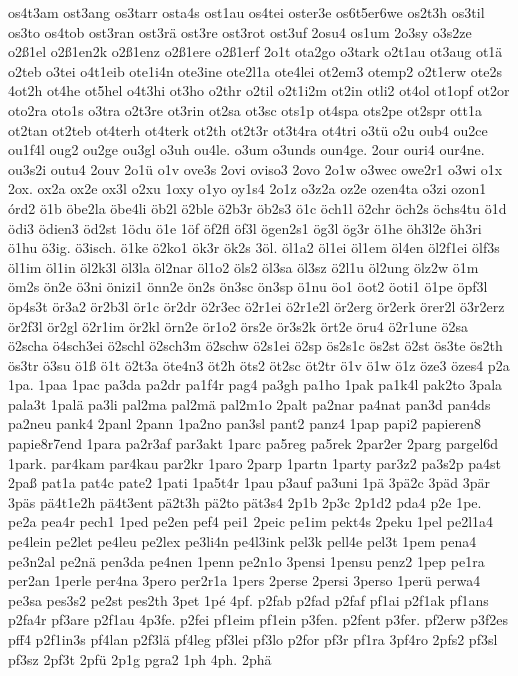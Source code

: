 {os4t3am
ost3ang
os3tarr
osta4s
ost1au
os4tei
oster3e
os6t5er6we
os2t3h
os3til
os3to
os4tob
ost3ran
ost3rä
ost3re
ost3rot
ost3uf
2osu4
os1um
2o3sy
o3s2ze
o2ß1el
o2ß1en2k
o2ß1enz
o2ß1ere
o2ß1erf
2o1t
ota2go
o3tark
o2t1au
ot3aug
ot1ä
o2teb
o3tei
o4t1eib
ote1i4n
ote3ine
ote2l1a
ote4lei
ot2em3
otemp2
o2t1erw
ote2s
4ot2h
ot4he
ot5hel
o4t3hi
ot3ho
o2thr
o2til
o2t1i2m
ot2in
otli2
ot4ol
ot1opf
ot2or
oto2ra
oto1s
o3tra
o2t3re
ot3rin
ot2sa
ot3sc
ots1p
ot4spa
ots2pe
ot2spr
ott1a
ot2tan
ot2teb
ot4terh
ot4terk
ot2th
ot2t3r
ot3t4ra
ot4tri
o3tü
o2u
oub4
ou2ce
ou1f4l
oug2
ou2ge
ou3gl
o3uh
ou4le.
o3um
o3unds
oun4ge.
2our
ouri4
our4ne.
ou3s2i
outu4
2ouv
2o1ü
o1v
ove3s
2ovi
oviso3
2ovo
2o1w
o3wec
owe2r1
o3wi
o1x
2ox.
ox2a
ox2e
ox3l
o2xu
1oxy
o1yo
oy1s4
2o1z
o3z2a
oz2e
ozen4ta
o3zi
ozon1
órd2
ö1b
öbe2la
öbe4li
öb2l
ö2ble
ö2b3r
öb2s3
ö1c
öch1l
ö2chr
öch2s
öchs4tu
ö1d
ödi3
ödien3
öd2st
1ödu
ö1e
1öf
öf2fl
öf3l
ögen2s1
ög3l
ög3r
ö1he
öh3l2e
öh3ri
ö1hu
ö3ig.
ö3isch.
ö1ke
ö2ko1
ök3r
ök2s
3öl.
öl1a2
öl1ei
öl1em
öl4en
öl2f1ei
ölf3s
öl1im
öl1in
öl2k3l
öl3la
öl2nar
öl1o2
öls2
öl3sa
öl3sz
ö2l1u
öl2ung
ölz2w
ö1m
öm2s
ön2e
ö3ni
önizi1
önn2e
ön2s
ön3sc
ön3sp
ö1nu
öo1
öot2
öoti1
ö1pe
öpf3l
öp4s3t
ör3a2
ör2b3l
ör1c
ör2dr
ö2r3ec
ö2r1ei
ö2r1e2l
ör2erg
ör2erk
örer2l
ö3r2erz
ör2f3l
ör2gl
ö2r1im
ör2kl
örn2e
ör1o2
örs2e
ör3s2k
ört2e
öru4
ö2r1une
ö2sa
ö2scha
ö4sch3ei
ö2schl
ö2sch3m
ö2schw
ö2s1ei
ö2sp
ös2s1c
ös2st
ö2st
ös3te
ös2th
ös3tr
ö3su
ö1ß
ö1t
ö2t3a
öte4n3
öt2h
öts2
öt2sc
öt2tr
ö1v
ö1w
ö1z
öze3
özes4
p2a
1pa.
1paa
1pac
pa3da
pa2dr
pa1f4r
pag4
pa3gh
pa1ho
1pak
pa1k4l
pak2to
3pala
pala3t
1palä
pa3li
pal2ma
pal2mä
pal2m1o
2palt
pa2nar
pa4nat
pan3d
pan4ds
pa2neu
pank4
2panl
2pann
1pa2no
pan3sl
pant2
panz4
1pap
papi2
papieren8
papie8r7end
1para
pa2r3af
par3akt
1parc
pa5reg
pa5rek
2par2er
2parg
pargel6d
1park.
par4kam
par4kau
par2kr
1paro
2parp
1partn
1party
par3z2
pa3s2p
pa4st
2paß
pat1a
pat4c
pate2
1pati
1pa5t4r
1pau
p3auf
pa3uni
1pä
3pä2c
3päd
3pär
3päs
pä4t1e2h
pä4t3ent
pä2t3h
pä2to
pät3s4
2p1b
2p3c
2p1d2
pda4
p2e
1pe.
pe2a
pea4r
pech1
1ped
pe2en
pef4
pei1
2peic
pe1im
pekt4s
2peku
1pel
pe2l1a4
pe4lein
pe2let
pe4leu
pe2lex
pe3li4n
pe4l3ink
pel3k
pell4e
pel3t
1pem
pena4
pe3n2al
pe2nä
pen3da
pe4nen
1penn
pe2n1o
3pensi
1pensu
penz2
1pep
pe1ra
per2an
1perle
per4na
3pero
per2r1a
1pers
2perse
2persi
3perso
1perü
perwa4
pe3sa
pes3s2
pe2st
pes2th
3pet
1pé
4pf.
p2fab
p2fad
p2faf
pf1ai
p2f1ak
pf1ans
p2fa4r
pf3are
p2f1au
4p3fe.
p2fei
pf1eim
pf1ein
p3fen.
p2fent
p3fer.
pf2erw
p3f2es
pff4
p2f1in3s
pf4lan
p2f3lä
pf4leg
pf3lei
pf3lo
p2for
pf3r
pf1ra
3pf4ro
2pfs2
pf3sl
pf3sz
2pf3t
2pfü
2p1g
pgra2
1ph
4ph.
2phä
}
